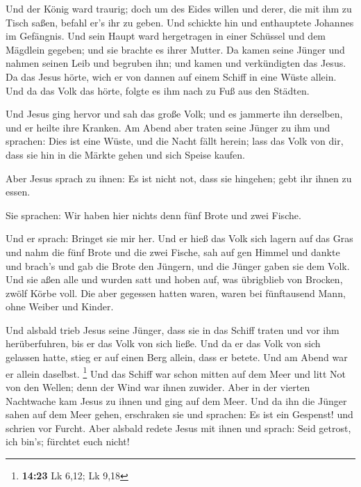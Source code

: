  Und der König ward traurig; doch um des Eides willen und
derer, die mit ihm zu Tisch saßen, befahl er's ihr zu geben.
 Und schickte hin und enthauptete Johannes im Gefängnis.
 Und sein Haupt ward hergetragen in einer Schüssel und dem
Mägdlein gegeben; und sie brachte es ihrer Mutter.  Da
kamen seine Jünger und nahmen seinen Leib und begruben ihn; und kamen
und verkündigten das Jesus.  Da das Jesus hörte, wich er
von dannen auf einem Schiff in eine Wüste allein. Und da das Volk das
hörte, folgte es ihm nach zu Fuß aus den Städten.

 Und Jesus ging hervor und sah das große Volk; und es
jammerte ihn derselben, und er heilte ihre Kranken.  Am
Abend aber traten seine Jünger zu ihm und sprachen: Dies ist eine Wüste,
und die Nacht fällt herein; lass das Volk von dir, dass sie hin in die
Märkte gehen und sich Speise kaufen.

 Aber Jesus sprach zu ihnen: Es ist nicht not, dass sie
hingehen; gebt ihr ihnen zu essen.

 Sie sprachen: Wir haben hier nichts denn fünf Brote und
zwei Fische.

 Und er sprach: Bringet sie mir her.  Und er
hieß das Volk sich lagern auf das Gras und nahm die fünf Brote und die
zwei Fische, sah auf gen Himmel und dankte und brach's und gab die Brote
den Jüngern, und die Jünger gaben sie dem Volk.  Und sie
aßen alle und wurden satt und hoben auf, was übrigblieb von Brocken,
zwölf Körbe voll.  Die aber gegessen hatten waren, waren
bei fünftausend Mann, ohne Weiber und Kinder.

 Und alsbald trieb Jesus seine Jünger, dass sie in das
Schiff traten und vor ihm herüberfuhren, bis er das Volk von sich ließe.
 Und da er das Volk von sich gelassen hatte, stieg er auf
einen Berg allein, dass er betete. Und am Abend war er allein daselbst.
\footnote{\textbf{14:23} Lk 6,12; Lk 9,18}  Und das Schiff
war schon mitten auf dem Meer und litt Not von den Wellen; denn der Wind
war ihnen zuwider.  Aber in der vierten Nachtwache kam
Jesus zu ihnen und ging auf dem Meer.  Und da ihn die
Jünger sahen auf dem Meer gehen, erschraken sie und sprachen: Es ist ein
Gespenst! und schrien vor Furcht.  Aber alsbald redete
Jesus mit ihnen und sprach: Seid getrost, ich bin's; fürchtet euch
nicht!

